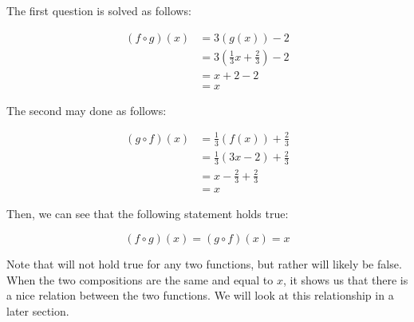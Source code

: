 \documentclass[12pt]{article}
\theoremstyle{definition}
\begin{document}
The first question is solved as follows:

\begin{align}
    (f \circ g)(x) & = 3(g(x)) - 2                                  \\
                   & = 3\left(\frac{1}{3}x + \frac{2}{3}\right) - 2 \\
                   & = x + 2 - 2                                    \\
                   & = x
\end{align}

The second may done as follows:

\begin{align}
    (g \circ f)(x) & = \frac{1}{3}(f(x)) + \frac{2}{3}   \\
                   & = \frac{1}{3}(3x - 2) + \frac{2}{3} \\
                   & = x - \frac{2}{3} + \frac{2}{3}     \\
                   & = x
\end{align}

Then, we can see that the following statement holds true:

\begin{equation}
    (f \circ g)(x) = (g \circ f)(x) = x
\end{equation}

Note that will not hold true for any two functions, but rather will likely be false.
When the two compositions are the same and equal to $x$, it shows us that there is a nice relation between the two functions.
We will look at this relationship in a later section.
\end{document}
